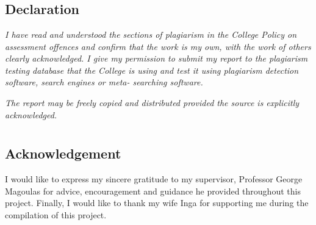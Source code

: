 \documentclass[12pt, twoside, a4paper, openright]{report}
\begin{document}

\chapter*{}

\vfill
\section*{Declaration}
\textit{I have read and understood the sections of plagiarism in the College Policy on assessment offences and confirm that the work is my own, with the work of others clearly acknowledged. I give my permission to submit my report to the plagiarism testing database that the College is using and test it using plagiarism detection software, search engines or meta- searching software.}

\textit{The report may be freely copied and distributed provided the source is explicitly acknowledged.}
\vfill

\cleardoublepage

\chapter*{}
\section*{Acknowledgement}
I would like to express my sincere gratitude to my supervisor, Professor George Magoulas for advice, encouragement and guidance he provided throughout this project. 
Finally, I would like to thank my wife Inga for supporting me during the compilation of this project.



\tableofcontents
\thispagestyle{empty}
\cleardoublepage
    
\setcounter{page}{1}












% 





\printbibliography[heading=bibintoc,
title={References}]
\end{document}
